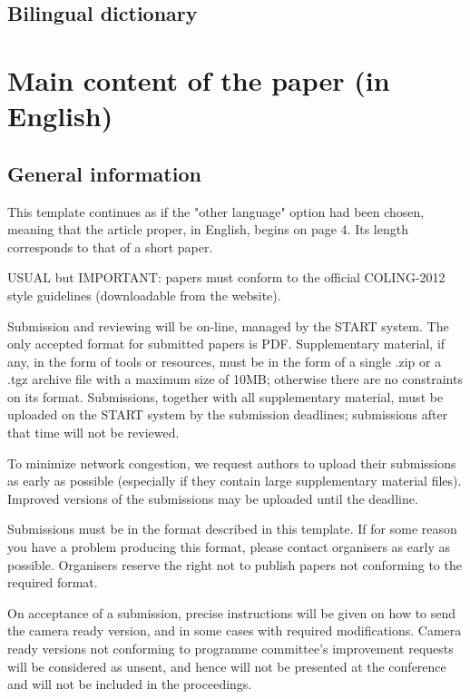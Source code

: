 \documentclass[10pt,a5paper,twoside]{article}
\begin{document}
\subsection{Bilingual dictionary}

\section{Main content of the paper (in English)}
\subsection{General information}
This template continues as if the "other language" option had been chosen, meaning that the article proper, in English, begins on page 4. Its length corresponds to that of a short paper.

USUAL but IMPORTANT: papers must conform to the official COLING-2012 style guidelines (downloadable from the website).

Submission and reviewing will be on-line, managed by the START system. The only accepted format for submitted papers is PDF. Supplementary material, if any, in the form of tools or resources, must be in the form of a single .zip or a .tgz archive file with a maximum size of 10MB; otherwise there are no constraints on its format. Submissions, together with all supplementary material, must be uploaded on the START system by the submission deadlines; submissions after that time will not be reviewed.

To minimize network congestion, we request authors to upload their submissions as early as possible (especially if they contain large supplementary material files). Improved versions of the submissions may be uploaded until the deadline.

Submissions must be in the format described in this template. If for some reason you have a problem producing this format, please contact organisers as early as possible. Organisers reserve the right not to publish papers not conforming to the required format.

On acceptance of a submission, precise instructions will be given on how to send the camera ready version, and in some cases with required modifications. Camera ready versions not conforming to programme committee’s improvement requests will be considered as unsent, and hence will not be presented at the conference and will not be included in the proceedings.
\end{document}
